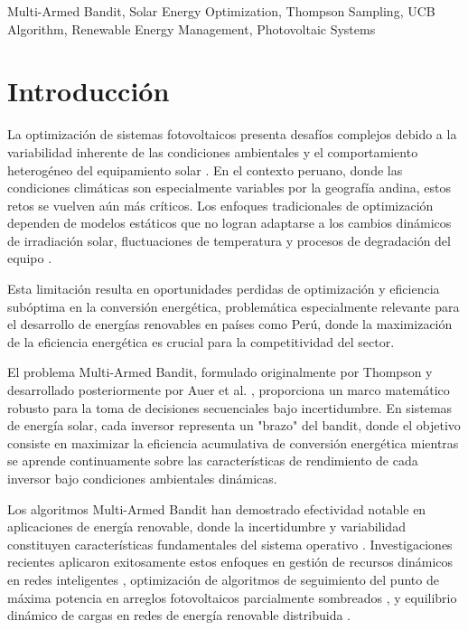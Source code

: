 \documentclass[conference]{IEEEtran}
\begin{document}
\begin{IEEEkeywords}
Multi-Armed Bandit, Solar Energy Optimization, Thompson Sampling, UCB Algorithm, Renewable Energy Management, Photovoltaic Systems
\end{IEEEkeywords}

\section{Introducción}

La optimización de sistemas fotovoltaicos presenta desafíos complejos debido a la variabilidad inherente de las condiciones ambientales y el comportamiento heterogéneo del equipamiento solar \cite{mahmoud2021}. En el contexto peruano, donde las condiciones climáticas son especialmente variables por la geografía andina, estos retos se vuelven aún más críticos. Los enfoques tradicionales de optimización dependen de modelos estáticos que no logran adaptarse a los cambios dinámicos de irradiación solar, fluctuaciones de temperatura y procesos de degradación del equipo \cite{rezk2020}.

Esta limitación resulta en oportunidades perdidas de optimización y eficiencia subóptima en la conversión energética, problemática especialmente relevante para el desarrollo de energías renovables en países como Perú, donde la maximización de la eficiencia energética es crucial para la competitividad del sector.

El problema Multi-Armed Bandit, formulado originalmente por Thompson \cite{thompson1933} y desarrollado posteriormente por Auer et al. \cite{auer2002}, proporciona un marco matemático robusto para la toma de decisiones secuenciales bajo incertidumbre. En sistemas de energía solar, cada inversor representa un "brazo" del bandit, donde el objetivo consiste en maximizar la eficiencia acumulativa de conversión energética mientras se aprende continuamente sobre las características de rendimiento de cada inversor bajo condiciones ambientales dinámicas.

Los algoritmos Multi-Armed Bandit han demostrado efectividad notable en aplicaciones de energía renovable, donde la incertidumbre y variabilidad constituyen características fundamentales del sistema operativo \cite{li2021}. Investigaciones recientes aplicaron exitosamente estos enfoques en gestión de recursos dinámicos en redes inteligentes \cite{kumar2021}, optimización de algoritmos de seguimiento del punto de máxima potencia en arreglos fotovoltaicos parcialmente sombreados \cite{batarseh2020}, y equilibrio dinámico de cargas en redes de energía renovable distribuida \cite{wang2022}.
\end{document}
